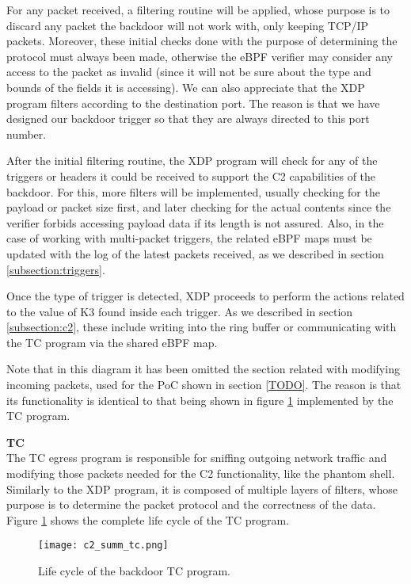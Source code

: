 For any packet received, a filtering routine will be applied, whose purpose is to discard any packet the backdoor will not work with, only keeping TCP/IP packets. Moreover, these initial checks done with the purpose of determining the protocol must always been made, otherwise the eBPF verifier may consider any access to the packet as invalid (since it will not be sure about the type and bounds of the fields it is accessing). We can also appreciate that the XDP program filters according to the destination port. The reason is that we have designed our backdoor trigger so that they are always directed to this port number.

After the initial filtering routine, the XDP program will check for any of the triggers or headers it could be received to support the C2 capabilities of the backdoor. For this, more filters will be implemented, usually checking for the payload or packet size first, and later checking for the actual contents since the verifier forbids accessing payload data if its length is not assured. Also, in the case of working with multi-packet triggers, the related eBPF maps must be updated with the log of the latest packets received, as we described in section \ref{subsection:triggers}.

Once the type of trigger is detected, XDP proceeds to perform the actions related to the value of K3 found inside each trigger. As we described in section \ref{subsection:c2}, these include writing into the ring buffer or communicating with the TC program via the shared eBPF map.

Note that in this diagram it has been omitted the section related with modifying incoming packets, used for the PoC shown in section \ref{TODO}. The reason is that its functionality is identical to that being shown in figure \ref{fig:c2_summ_tc} implemented by the TC program.


\textbf{TC}\\
The TC egress program is responsible for sniffing outgoing network traffic and modifying those packets needed for the C2 functionality, like the phantom shell. Similarly to the XDP program, it is composed of multiple layers of filters, whose purpose is to determine the packet protocol and the correctness of the data. Figure \ref{fig:c2_summ_tc} shows the complete life cycle of the TC program.

\begin{figure}[htbp]
	\centering
	\texttt{[image: c2\_summ\_tc.png]}
	\caption{Life cycle of the backdoor TC program.}
	\label{fig:c2_summ_tc}
\end{figure}

